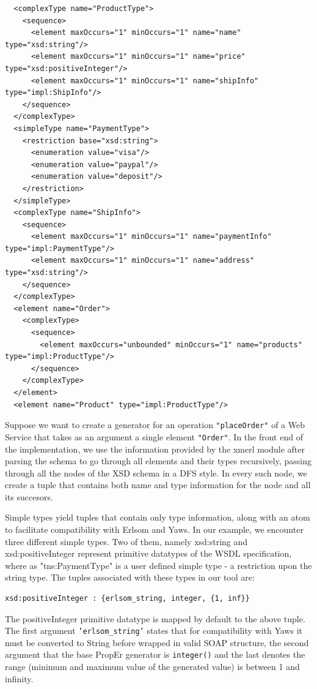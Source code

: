 \documentclass[submission,copyright,a4]{eptcs}
\begin{document}
\begin{lstlisting}
  <complexType name="ProductType">
    <sequence>
      <element maxOccurs="1" minOccurs="1" name="name" type="xsd:string"/>
      <element maxOccurs="1" minOccurs="1" name="price" type="xsd:positiveInteger"/>
      <element maxOccurs="1" minOccurs="1" name="shipInfo" type="impl:ShipInfo"/>
    </sequence>
  </complexType>
  <simpleType name="PaymentType">
    <restriction base="xsd:string">
      <enumeration value="visa"/>
      <enumeration value="paypal"/>
      <enumeration value="deposit"/>
    </restriction>
  </simpleType>
  <complexType name="ShipInfo">
    <sequence>
      <element maxOccurs="1" minOccurs="1" name="paymentInfo" type="impl:PaymentType"/>
      <element maxOccurs="1" minOccurs="1" name="address" type="xsd:string"/>
    </sequence>
  </complexType>
  <element name="Order">
    <complexType>
      <sequence>
        <element maxOccurs="unbounded" minOccurs="1" name="products" type="impl:ProductType"/>
      </sequence>
    </complexType>
  </element>
  <element name="Product" type="impl:ProductType"/>
\end{lstlisting}


Suppose we want to create a generator for an operation \texttt{"placeOrder"} of a Web Service that takes as an argument a single element \texttt{"Order"}. In the front end of the implementation, we use the information provided by the xmerl module after parsing the schema to go through all elements and their types recursively, passing through all the nodes of the XSD schema in a DFS style. In every such node, we create a tuple that contains both name and type information for the node and all its succesors. 

Simple types yield tuples that contain only type information, along with an atom to facilitate compatibility with Erlsom and Yaws. In our example, we encounter three different simple types. Two of them, namely xsd:string and xsd:positiveInteger represent primitive datatypes of the WSDL specification, where as "tns:PaymentType" is a user defined simple type - a restriction upon the string type. The tuples associated with these types in our tool are:

\begin{lstlisting}
xsd:positiveInteger : {erlsom_string, integer, {1, inf}}
\end{lstlisting}

The positiveInteger primitive datatype is mapped by default to the above tuple. The first argument \texttt{'erlsom\_string'} states that for compatibility with Yaws it must be converted to String before wrapped in valid SOAP structure, the second argument that the base PropEr generator is \texttt{integer()} and the last denotes the range (minimum and maximum value of the generated value) is between 1 and infinity. 
\end{document}
